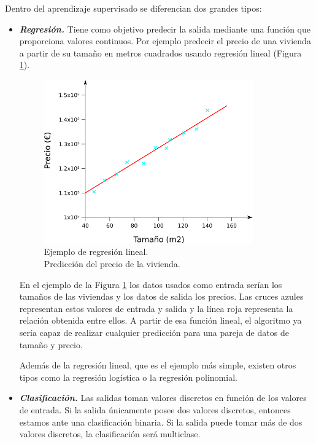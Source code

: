 \noindent Dentro del aprendizaje supervisado se diferencian dos grandes tipos:
\begin{itemize}
\item \textit{\textbf{Regresión.}} Tiene como objetivo predecir la salida mediante una función que proporciona valores continuos. Por ejemplo predecir el precio de una vivienda a partir de su tamaño en metros cuadrados usando regresión lineal (Figura \ref{fig:ejemplo_regresion}).

\begin{figure} [h!]
  \begin{center}
    \includegraphics[width=9cm]{figs/ejemplo_regresion.png}
  \end{center}
  \caption{Ejemplo de regresión lineal.\\
  Predicción del precio de la vivienda.}
  \label{fig:ejemplo_regresion}
\end{figure}

En el ejemplo de la Figura \ref{fig:ejemplo_regresion} los datos usados como entrada serían los tamaños de las viviendas y los datos de salida los precios. Las cruces azules representan estos valores de entrada y salida y la línea roja representa la relación obtenida entre ellos. A partir de esa función lineal, el algoritmo ya sería capaz de realizar cualquier predicción para una pareja de datos de tamaño y precio.

Además de la regresión lineal, que es el ejemplo más simple, existen otros tipos como la regresión logística o la regresión polinomial.

\item \textit{\textbf{Clasificación.}} Las salidas toman valores discretos en función de los valores de entrada. Si la salida únicamente posee dos valores discretos, entonces estamos ante una clasificación binaria. Si la salida puede tomar más de dos valores discretos, la clasificación será multiclase.


\end{itemize}
